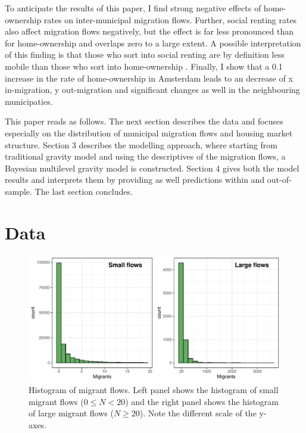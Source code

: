 \documentclass[fleqn,10pt]{SelfArx} %
\begin{document}
        To anticipate the results of this paper, I find strong negative effects
        of home-ownership rates on inter-municipal migration flows. Further,
        social renting rates also affect migration flows negatively, but the
        effect is far less pronounced than for home-ownership and overlaps zero
        to a large extent. A possible interpretation of this finding is that
        those who sort into social renting are by definition less mobile than
        those who sort into home-ownership \citep[this argument is put forward
        by][as well]{boyle1998migration}. Finally, I show that a 0.1 increase in
        the rate of home-ownership in Amsterdam leads to an decrease of x
        in-migration, y out-migration and significant changes as well in the
        neighbouring municipaties.

        This paper reads as follows. The next section describes the data and
        focuses especially on the distribution of municipal migration flows and
        housing market structure. Section 3 describes the modelling
        approach, where starting from traditional gravity model and using the
        descriptives of the migration flows, a Bayesian multilevel gravity model
        is constructed. Section 4 gives both the model results and interprets
        them by providing as well predictions within and out-of-sample. The last
        section concludes.
        
        \section{Data}

        \begin{figure}[t!]\centering %
          \includegraphics[width=0.8\linewidth]{../fig/hist_mig.pdf}
          \caption{Histogram of migrant flows. Left panel shows the
            histogram of small migrant flows ($0 \leq N < 20$) and the right
            panel shows the histogram of large migrant flows
            ($N \geq 20$). Note the different scale of the y-axes.}
          \label{fig:hist_mig}
        \end{figure}
\end{document}
